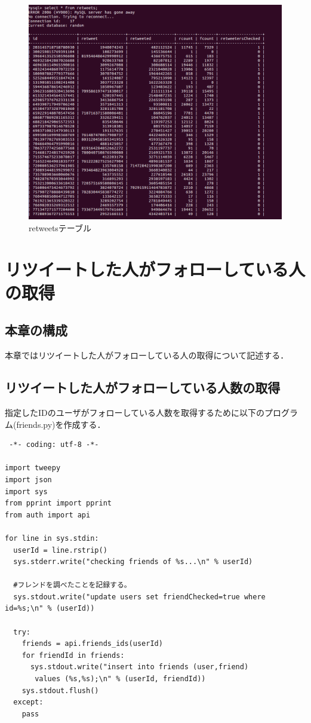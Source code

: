 \begin{figure}[htb]
\centering
\includegraphics[width=13cm]{table_retweets.png}
\caption{retweetsテーブル}\label{table_retweets}
\end{figure}

\newpage

\section{リツイートした人がフォローしている人の取得}

\subsection{本章の構成}
本章ではリツイートした人がフォローしている人の取得について記述する．

\subsection{リツイートした人がフォローしている人数の取得}
指定したIDのユーザがフォローしている人数を取得するために以下のプログラム(friends.py)を作成する．

\begin{verbatim}
 -*- coding: utf-8 -*-

import tweepy
import json
import sys
from pprint import pprint
from auth import api

for line in sys.stdin:
  userId = line.rstrip()
  sys.stderr.write("checking friends of %s...\n" % userId)
  
  #フレンドを調べたことを記録する。
  sys.stdout.write("update users set friendChecked=true where id=%s;\n" % (userId))
  
  try:
    friends = api.friends_ids(userId)
    for friendId in friends:
      sys.stdout.write("insert into friends (user,friend)
       values (%s,%s);\n" % (userId, friendId))
    sys.stdout.flush()
  except:
    pass

\end{verbatim}

